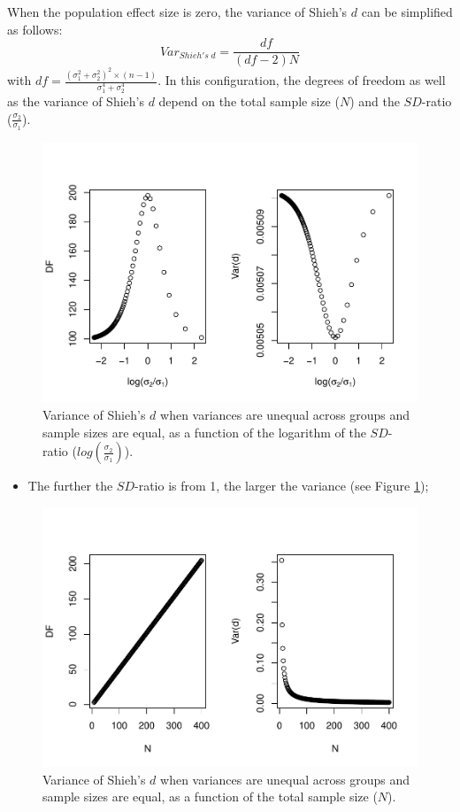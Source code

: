 \documentclass[
  english,
  man,mask]{apa6}
\providecommand{\tightlist}{%
  \setlength{\itemsep}{0pt}\setlength{\parskip}{0pt}}
\begin{document}
When the population effect size is zero, the variance of Shieh's \(d\) can be simplified as follows:
\[Var_{Shieh's \; d} = \frac{df}{(df-2)N}\]
with \(df = \frac{(\sigma_1^2+\sigma_2^2)^2 \times (n-1)}{\sigma_1^4+\sigma_2^4}\). In this configuration, the degrees of freedom as well as the variance of Shieh's \(d\) depend on the total sample size (\(N\)) and the \(SD\)-ratio (\(\frac{\sigma_2}{\sigma_1}\)).

\begin{figure}
\centering
\includegraphics{SupMat1_files/figure-latex/varshiehhetbalSDratio2-1.pdf}
\caption{\label{fig:varshiehhetbalSDratio2}Variance of Shieh's \(d\) when variances are unequal across groups and sample sizes are equal, as a function of the logarithm of the \(SD\)-ratio (\(log \left( \frac{\sigma_2}{\sigma_1} \right)\)).}
\end{figure}

\begin{itemize}
\tightlist
\item
  The further the \(SD\)-ratio is from 1, the larger the variance (see Figure \ref{fig:varshiehhetbalSDratio2});
\end{itemize}

\begin{figure}
\centering
\includegraphics{SupMat1_files/figure-latex/varshiehhetbalNsize2-1.pdf}
\caption{\label{fig:varshiehhetbalNsize2}Variance of Shieh's \(d\) when variances are unequal across groups and sample sizes are equal, as a function of the total sample size (\(N\)).}
\end{figure}
\end{document}
